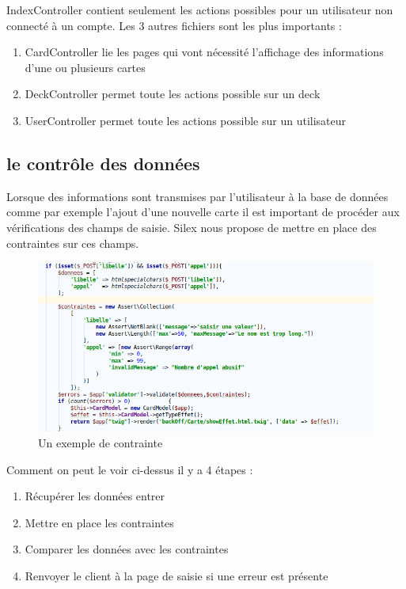 \documentclass[a4paper,11pt]{report}
\begin{document}
	IndexController contient seulement les actions possibles pour un utilisateur non connecté à un compte. Les 3 autres fichiers sont les plus importants :

	\begin{enumerate}
		\item CardController lie les pages qui vont nécessité l'affichage des informations d'une ou plusieurs cartes
		\item DeckController permet toute les actions possible sur un deck
		\item UserController permet toute les actions possible sur un utilisateur
	\end{enumerate}

	\subsection{le contrôle des données}
	Lorsque des informations sont transmises par l'utilisateur à la base de données comme par exemple l'ajout d'une nouvelle carte il est important de procéder aux vérifications des champs de saisie. Silex nous propose de mettre en place des contraintes sur ces champs.
    \begin{figure}[th]
      \begin{center}
        \includegraphics[scale=0.4]{Assets/exemple_contrainte.png}
        \caption{Un exemple de contrainte}
        \label{fig8}
      \end{center}
    \end{figure}

	Comment on peut le voir ci-dessus il y a 4 étapes :
	\begin{enumerate}
		\item Récupérer les données entrer
		\item Mettre en place les contraintes
		\item Comparer les données avec les contraintes
		\item Renvoyer le client à la page de saisie si une erreur est présente
	\end{enumerate}
\end{document}
